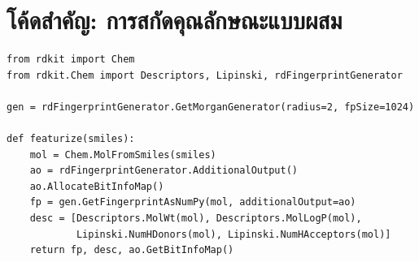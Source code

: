 \section{โค้ดสำคัญ: การสกัดคุณลักษณะแบบผสม}

\begin{verbatim}
from rdkit import Chem
from rdkit.Chem import Descriptors, Lipinski, rdFingerprintGenerator

gen = rdFingerprintGenerator.GetMorganGenerator(radius=2, fpSize=1024)

def featurize(smiles):
    mol = Chem.MolFromSmiles(smiles)
    ao = rdFingerprintGenerator.AdditionalOutput()
    ao.AllocateBitInfoMap()
    fp = gen.GetFingerprintAsNumPy(mol, additionalOutput=ao)
    desc = [Descriptors.MolWt(mol), Descriptors.MolLogP(mol),
            Lipinski.NumHDonors(mol), Lipinski.NumHAcceptors(mol)]
    return fp, desc, ao.GetBitInfoMap()
\end{verbatim}
